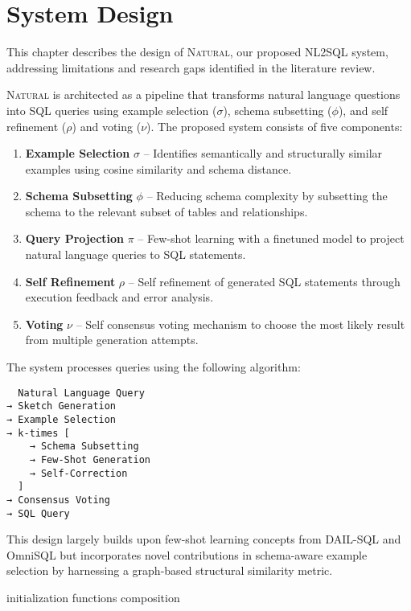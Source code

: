 \section{System Design}\label{section:design}

This chapter describes the design of \textsc{Natural}, our proposed NL2SQL system, 
addressing limitations and research gaps identified in the literature review.

\textsc{Natural} is architected as a pipeline that transforms natural
language questions into SQL queries using example selection ($\sigma$),
schema subsetting ($\phi$), and self refinement ($\rho$) and voting ($\nu$).
The proposed system consists of five components:

\begin{enumerate}
    \item \textbf{Example Selection} $\sigma$ – Identifies semantically and structurally similar examples using cosine similarity and schema distance.
    \item \textbf{Schema Subsetting} $\phi$ – Reducing schema complexity by subsetting the schema to the relevant subset of tables and relationships.
    \item \textbf{Query Projection} $\pi$ – Few-shot learning with a finetuned model to project natural language queries to SQL statements.
    \item \textbf{Self Refinement} $\rho$ – Self refinement of generated SQL statements through execution feedback and error analysis.
    \item \textbf{Voting} $\nu$ – Self consensus voting mechanism to choose the most likely result from multiple generation attempts.
\end{enumerate}

The system processes queries using the following algorithm:


\begin{verbatim}
  Natural Language Query 
→ Sketch Generation
→ Example Selection
→ k-times [
    → Schema Subsetting
    → Few-Shot Generation
    → Self-Correction
  ]
→ Consensus Voting
→ SQL Query
\end{verbatim}

This design largely builds upon few-shot learning concepts from DAIL-SQL \citep{DAIL-SQL}
and OmniSQL \citep{OmniSQL} but incorporates novel contributions in schema-aware example
selection by harnessing a graph-based structural similarity metric.

{initialization}
{functions}
{composition}
